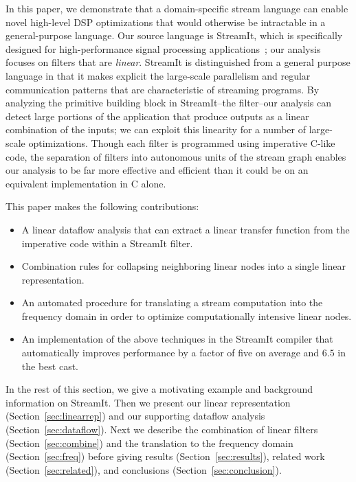 In this paper, we demonstrate that a domain-specific stream language
can enable novel high-level DSP optimizations that would otherwise be
intractable in a general-purpose language.  Our source language is
StreamIt, which is specifically designed for high-performance signal
processing applications~\cite{streamit-asplos,streamitcc}; our
analysis focuses on filters that are {\it linear}.  StreamIt is
distinguished from a general purpose language in that it makes
explicit the large-scale parallelism and regular communication
patterns that are characteristic of streaming programs.  By analyzing
the primitive building block in StreamIt--the filter--our analysis can
detect large portions of the application that produce outputs as a
linear combination of the inputs; we can exploit this linearity
for a number of large-scale optimizations.  Though each filter is
programmed using imperative C-like code, the separation of filters
into autonomous units of the stream graph enables our analysis to be
far more effective and efficient than it could be on an equivalent
implementation in C alone.

This paper makes the following contributions:
\begin{itemize}

\item A linear dataflow analysis that can extract a linear transfer
function from the imperative code within a StreamIt filter.
\vspace{-6pt}

\item Combination rules for collapsing neighboring linear nodes into a
single linear representation.
\vspace{-6pt}

\item An automated procedure for translating a stream computation into
the frequency domain in order to optimize computationally intensive
linear nodes.
\vspace{-6pt}

\item An implementation of the above techniques in the StreamIt
compiler that automatically improves performance by a factor of
five on average and $6.5$ in the best cast.

\end{itemize}

In the rest of this section, we give a motivating example and
background information on StreamIt.  Then we present our linear
representation (Section~\ref{sec:linearrep}) and our 
supporting dataflow analysis (Section~\ref{sec:dataflow}).  
Next we describe the
combination of linear filters (Section~\ref{sec:combine}) and the
translation to the frequency domain (Section~\ref{sec:freq}) before
giving results (Section~\ref{sec:results}), related work
(Section~\ref{sec:related}), and conclusions
(Section~\ref{sec:conclusion}).

